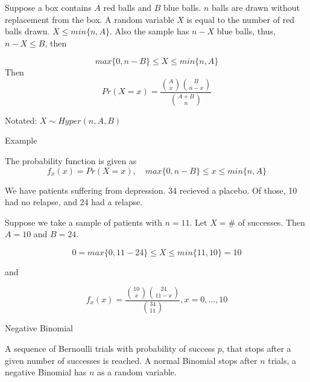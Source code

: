 \documentclass{report}
\begin{document}
\begin{description}
\begin{mdframed}
            Suppose a box contains $A$ red balls and
            $B$ blue balls. $n$ balls are drawn without
            replacement from the box. A random variable
            $X$ is equal to the number of red balls drawn.
            $X \le min\{n, A\}$. Also the sample has $n-X$ 
            blue balls, thus, $n - X \le B$, then

             \begin{displaymath}
                 max\{0, n-B\} \le X \le min\{n, A\}
            \end{displaymath}
            Then
            \begin{displaymath}
                Pr(X=x) = \frac{\binom{A}{x}\binom{B}{n-x}}{\binom{A+B}{n}}
            \end{displaymath}
            
            Notated: $X \sim Hyper(n, A, B)$
        \end{mdframed}
    \item {\large Example}
        \begin{mdframed}
            The probability function is given as
            \begin{displaymath}
                f_x(x) = Pr(X=x), \quad
                max\{0, n-B\} \le x \le min\{n, A\}
            \end{displaymath}
            
            We have patients suffering from depression. 34
            recieved a placebo. Of those, 10 had no relapse,
            and 24 had a relapse.

            Suppose we take a sample of patients with $n=11$.
            Let $X = \#$ of successes. Then $A = 10$ and $B = 24$. 

             \begin{displaymath}
                 0 = max\{0, 11-24\} \le X \le min\{11, 10\} = 10
             \end{displaymath}

             and

             \begin{displaymath}
                 f_x(x) = \frac{\binom{10}{x}\binom{24}{11-x}}{\binom{34}{11}}, x = 0, ...,10
             \end{displaymath}
        \end{mdframed}
        \pagebreak
    \item {\large Negative Binomial}
        \begin{mdframed}
            A sequence of Bernoulli trials with probability of
            success $p$, that stops after a given number of successes
            is reached. A normal Binomial stops after $n$ trials,
            a negative Binomial has $n$ as a random variable.


\end{mdframed}
\end{description}
\end{document}

